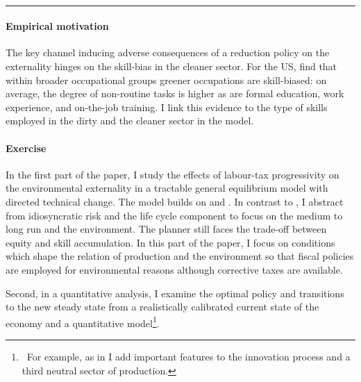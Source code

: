 \\

\noindent\rule[1ex]{\textwidth}{1pt}

\paragraph{Empirical motivation}
The key channel inducing adverse consequences of a reduction policy on the externality hinges on the skill-bias in the cleaner sector. %
For the US, \cite{Consoli2016DoCapital} find that within broader occupational groups greener occupations are skill-biased: on average, the degree of non-routine tasks is higher as are formal education, work experience, and on-the-job training. I link this evidence to the type of skills employed in the dirty and the cleaner sector in the model. %


\paragraph{Exercise}
In the first part of the paper, I study the effects of labour-tax progressivity  on the environmental externality in a tractable general equilibrium model with directed technical change. The model builds on \cite{Heathcote2017OptimalFramework} and \cite{Acemoglu2012TheChange}. 
In contrast to \cite{Heathcote2017OptimalFramework}, I abstract from idiosyncratic risk and the life cycle component to focus on the medium to long run and the environment. 
The planner still faces the trade-off between equity and skill accumulation. 
In this part of the paper, I focus on conditions which shape the relation of production and the environment so that fiscal policies are employed for environmental reasons although corrective taxes are available.  

Second, in a quantitative analysis, I examine the optimal policy and transitions to the new steady state from a realistically calibrated current state of the economy and a quantitative model\footnote{\ For example, as in  \cite{Fried2018ClimateAnalysis} I add important features to the innovation process and a third neutral sector of production.}.

